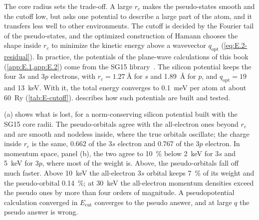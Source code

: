 The core radius sets the trade-off. A large $r_c$ makes the pseudo-states smooth and the cutoff low, but asks one potential to describe a large part of the atom, and it transfers less well to other environments. The cutoff is decided by the Fourier tail of the pseudo-states, and the optimized construction of Hamann chooses the shape inside $r_c$ to minimize the kinetic energy above a wavevector $q_{\mathrm{opt}}$ (\cref{eq:E.2-residual}). In practice, the potentials of the plane-wave calculations of this book (\cref{app:E.1,app:E.2}) come from the SG15 library~\cite{schlipf2015optimization}. The silicon potential keeps the four $3s$ and $3p$ electrons, with $r_c = \SI{1.27}{\angstrom}$ for $s$ and \SI{1.89}{\angstrom} for $p$, and $q_{\mathrm{opt}} = 19$ and \SI{13}{keV}. With it, the total energy converges to \SI{0.1}{meV} per atom at about \SI{60}{Ry} (\cref{tab:E-cutoff}).  describes how such potentials are built and tested.

(a) shows what is lost, for a norm-conserving silicon potential built with the SG15 core radii. The pseudo-orbitals agree with the all-electron ones beyond $r_c$ and are smooth and nodeless inside, where the true orbitals oscillate; the charge inside $r_c$ is the same, 0.662 of the $3s$ electron and 0.767 of the $3p$ electron. In momentum space, panel (b), the two agree to \SI{10}{\percent} below \SI{2}{keV} for $3s$ and \SI{5}{keV} for $3p$, where most of the weight is. Above, the pseudo-orbitals fall off much faster. Above \SI{10}{keV} the all-electron $3s$ orbital keeps \SI{7}{\percent} of its weight and the pseudo-orbital \SI{0.14}{\percent}; at \SI{30}{keV} the all-electron momentum densities exceed the pseudo ones by more than four orders of magnitude. A pseudopotential calculation converged in $E_{\mathrm{cut}}$ converges to the pseudo answer, and at large $q$ the pseudo answer is wrong.

